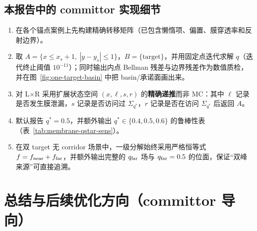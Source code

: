 \documentclass[11pt,fontset=fandol]{ctexart}
\begin{document}
\subsection*{本报告中的 committor 实现细节}
\begin{enumerate}
  \item 在各个锚点案例上先构建精确转移矩阵（已包含懒惰项、偏置、膜穿透率和反射边界）。
  \item 取 $A=\{x\le x_s+1,\ |y-y_s|\le 1\}$，$B=\{\text{target}\}$，并用固定点迭代求解 $q$（迭代终止阈值 $10^{-11}$）；同时输出内点 Bellman 残差与边界残差作为数值质检，并在图~\ref{fig:one-target-basin} 中把 basin/承诺面画出来。
  \item 对 L×R 采用扩展状态空间 $(x,\ell,s,r)$ 的\textbf{精确递推}而非 MC：其中 $\ell$ 记录是否发生膜泄漏，$s$ 记录是否访问过 $\Sigma_{q^*}$，$r$ 记录是否在访问 $\Sigma_{q^*}$ 后返回 $A$。
  \item 默认报告 $q^*=0.5$，并额外输出 $q^*\in\{0.4,0.5,0.6\}$ 的鲁棒性表（表~\ref{tab:membrane-qstar-sens}）。
  \item 在双 target 无 corridor 场景中，一级分解始终采用严格恒等式 $f=f_{\rm near}+f_{\rm far}$，并额外输出完整的 $q_{\rm far}$ 场与 $q_{\rm far}=0.5$ 的位面，保证“双峰来源”可直接追溯。
\end{enumerate}

\section{总结与后续优化方向（committor 导向）}
\end{document}
